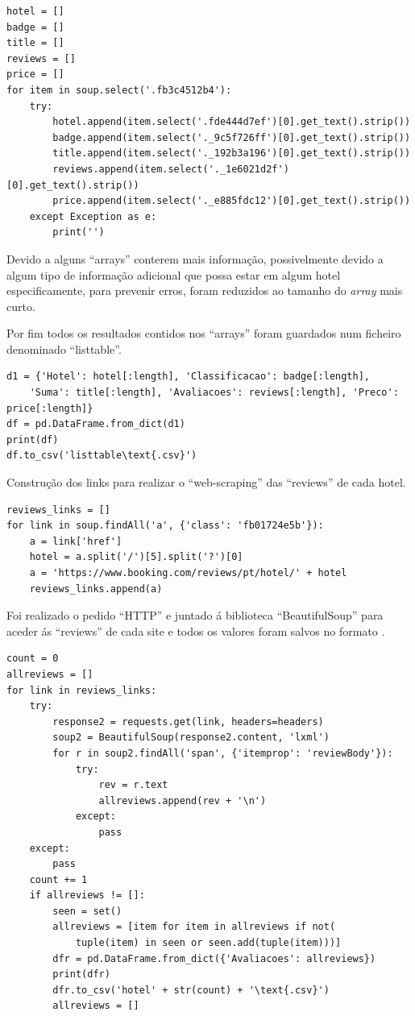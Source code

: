 \documentclass[a4paper,10pt]{article}
\begin{document}
\begin{verbatim}
hotel = []
badge = []
title = []
reviews = []
price = []
for item in soup.select('.fb3c4512b4'):
    try:
        hotel.append(item.select('.fde444d7ef')[0].get_text().strip())
        badge.append(item.select('._9c5f726ff')[0].get_text().strip())
        title.append(item.select('._192b3a196')[0].get_text().strip())
        reviews.append(item.select('._1e6021d2f')[0].get_text().strip())
        price.append(item.select('._e885fdc12')[0].get_text().strip())
    except Exception as e:
        print('')
\end{verbatim}

Devido a alguns ``arrays'' conterem mais informação, possivelmente devido a algum tipo de informação adicional que possa estar em algum hotel especificamente, para prevenir erros, foram reduzidos ao tamanho do \textit{array} mais curto.

Por fim todos os resultados contidos nos ``arrays'' foram guardados num ficheiro  denominado ``listtable''.

\begin{verbatim}
d1 = {'Hotel': hotel[:length], 'Classificacao': badge[:length],
    'Suma': title[:length], 'Avaliacoes': reviews[:length], 'Preco': price[:length]}
df = pd.DataFrame.from_dict(d1)
print(df)
df.to_csv('listtable\text{.csv}')
\end{verbatim}

Construção dos links para realizar o ``web-scraping'' das ``reviews'' de cada hotel.

\begin{verbatim}
reviews_links = []
for link in soup.findAll('a', {'class': 'fb01724e5b'}):
    a = link['href']
    hotel = a.split('/')[5].split('?')[0]
    a = 'https://www.booking.com/reviews/pt/hotel/' + hotel
    reviews_links.append(a)
\end{verbatim}

\newpage

Foi realizado o pedido ``HTTP'' e juntado á biblioteca ``BeautifulSoup'' para aceder ás ``reviews'' de cada site e todos os valores foram salvos no formato .

\begin{verbatim}
count = 0
allreviews = []
for link in reviews_links:
    try:
        response2 = requests.get(link, headers=headers)
        soup2 = BeautifulSoup(response2.content, 'lxml')
        for r in soup2.findAll('span', {'itemprop': 'reviewBody'}):
            try:
                rev = r.text
                allreviews.append(rev + '\n')
            except:
                pass
    except:
        pass
    count += 1
    if allreviews != []:
        seen = set()
        allreviews = [item for item in allreviews if not(
            tuple(item) in seen or seen.add(tuple(item)))]
        dfr = pd.DataFrame.from_dict({'Avaliacoes': allreviews})
        print(dfr)
        dfr.to_csv('hotel' + str(count) + '\text{.csv}')
        allreviews = []
\end{verbatim}
\end{document}
